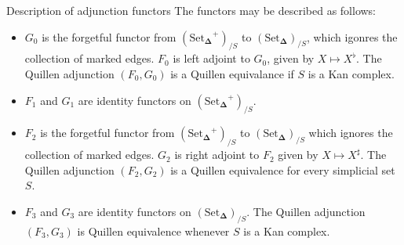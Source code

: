 \documentclass{beamer}[9pt]
\newcommand{\8}{\ensuremath{\infty}}
\newcommand{\SSet}{\ensuremath{\text{Set}_{\boldsymbol{\Delta}}}}
\begin{document}
\begin{frame}{Description of adjunction functors}
  The functors may be described as follows:

  \begin{itemize}
    \item<1->[(A0)] $G_0$ is the forgetful functor from $(\SSet^+)_{/S}$ to $(\SSet)_{/S}$, which igonres the collection of marked edges. $F_0$ is left adjoint to $G_0$, given by $X \mapsto X^\flat$. The Quillen adjunction $(F_0, G_0)$ is a Quillen equivalance if $S$ is a Kan complex.
    \item<2->[(A1)] $F_1$ and $G_1$ are identity functors on $(\SSet^+)_{/S}$.
    \item<3->[(A2)]  $F_2$ is the forgetful functor from $(\SSet^+)_{/S}$ to $(\SSet)_{/S}$ which ignores the collection of marked edges. $G_2$ is right adjoint to $F_2$ given by $X \mapsto X^\sharp$. The Quillen adjunction $(F_2, G_2)$ is a Quillen equivalence for every simplicial set $S$.
    \item<4>[(A3)]  $F_3$ and $G_3$ are identity functors on $(\SSet)_{/S}$. The Quillen adjunction $(F_3, G_3)$ is Quillen equivalence whenever $S$ is a Kan complex.
  \end{itemize}
\end{frame}
\end{document}
